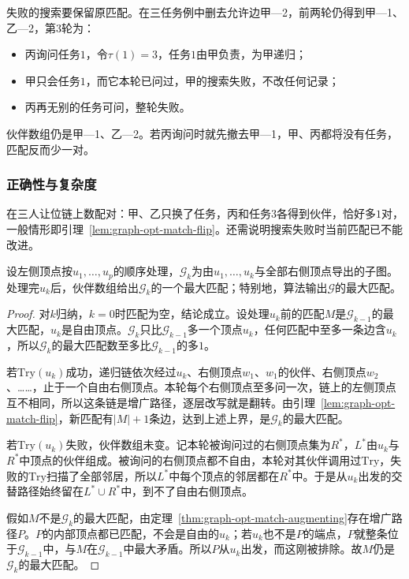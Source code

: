 失败的搜索要保留原匹配。在三任务例中删去允许边甲—2，前两轮仍得到甲—1、乙—2，第$3$轮为：
\begin{itemize}
  \item 丙询问任务$1$，令$\tau(1)=3$，任务$1$由甲负责，为甲递归；
  \item 甲只会任务$1$，而它本轮已问过，甲的搜索失败，不改任何记录；
  \item 丙再无别的任务可问，整轮失败。
\end{itemize}
伙伴数组仍是甲—1、乙—2。若丙询问时就先撤去甲—1，甲、丙都将没有任务，匹配反而少一对。

\subsubsection{正确性与复杂度}

在三人让位链上数配对：甲、乙只换了任务，丙和任务$3$各得到伙伴，恰好多$1$对，一般情形即引理~\ref{lem:graph-opt-match-flip}。还需说明搜索失败时当前匹配已不能改进。

\begin{theorem}[匈牙利算法的正确性]
设左侧顶点按$u_1,\ldots,u_p$的顺序处理，$\mathcal G_k$为由$u_1,\ldots,u_k$与全部右侧顶点导出的子图。处理完$u_k$后，伙伴数组给出$\mathcal G_k$的一个最大匹配；特别地，算法输出$\mathcal G$的最大匹配。
\end{theorem}

\begin{proof}
对$k$归纳，$k=0$时匹配为空，结论成立。设处理$u_k$前的匹配$M$是$\mathcal G_{k-1}$的最大匹配，$u_k$是自由顶点。$\mathcal G_k$只比$\mathcal G_{k-1}$多一个顶点$u_k$，任何匹配中至多一条边含$u_k$，所以$\mathcal G_k$的最大匹配数至多比$\mathcal G_{k-1}$的多$1$。

若$\mathrm{Try}(u_k)$成功，递归链依次经过$u_k$、右侧顶点$w_1$、$w_1$的伙伴、右侧顶点$w_2$、……，止于一个自由右侧顶点。本轮每个右侧顶点至多问一次，链上的左侧顶点互不相同，所以这条链是增广路径，逐层改写就是翻转。由引理~\ref{lem:graph-opt-match-flip}，新匹配有$|M|+1$条边，达到上述上界，是$\mathcal G_k$的最大匹配。

若$\mathrm{Try}(u_k)$失败，伙伴数组未变。记本轮被询问过的右侧顶点集为$R^*$，$L^*$由$u_k$与$R^*$中顶点的伙伴组成。被询问的右侧顶点都不自由，本轮对其伙伴调用过$\mathrm{Try}$，失败的$\mathrm{Try}$扫描了全部邻居，所以$L^*$中每个顶点的邻居都在$R^*$中。于是从$u_k$出发的交替路径始终留在$L^*\cup R^*$中，到不了自由右侧顶点。

假如$M$不是$\mathcal G_k$的最大匹配，由定理~\ref{thm:graph-opt-match-augmenting}存在增广路径$P$。$P$的内部顶点都已匹配，不会是自由的$u_k$；若$u_k$也不是$P$的端点，$P$就整条位于$\mathcal G_{k-1}$中，与$M$在$\mathcal G_{k-1}$中最大矛盾。所以$P$从$u_k$出发，而这刚被排除。故$M$仍是$\mathcal G_k$的最大匹配。
\end{proof}

